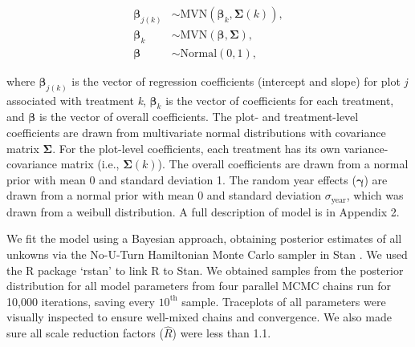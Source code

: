 \documentclass[fleqn,10pt]{wlpeerj} %
\begin{document}
\vspace{-2em}

\begin{align}
\boldsymbol{\beta}_{j(k)} &\sim \text{MVN} \left( \boldsymbol{\beta}_k, \boldsymbol{\Sigma}(k) \right), \\
\boldsymbol{\beta}_{k} &\sim \text{MVN} \left( \boldsymbol{\beta}, \boldsymbol{\Sigma}  \right), \\
\boldsymbol{\beta} &\sim \text{Normal} \left( 0, 1 \right),
\end{align}

\noindent{} where \(\boldsymbol{\beta}_{j(k)}\) is the vector of
regression coefficients (intercept and slope) for plot \emph{j}
associated with treatment \emph{k}, \(\boldsymbol{\beta}_{k}\) is the
vector of coefficients for each treatment, and \(\boldsymbol{\beta}\) is
the vector of overall coefficients. The plot- and treatment-level
coefficients are drawn from multivariate normal distributions with
covariance matrix \(\boldsymbol{\Sigma}\). For the plot-level
coefficients, each treatment has its own variance-covariance matrix
(i.e., \(\boldsymbol{\Sigma}(k)\)). The overall coefficients are drawn
from a normal prior with mean 0 and standard deviation 1. The random
year effects (\(\boldsymbol{\gamma}\)) are drawn from a normal prior
with mean 0 and standard deviation \(\sigma_{\text{year}}\), which was
drawn from a weibull distribution. A full description of model is in
Appendix 2.

We fit the model using a Bayesian approach, obtaining posterior
estimates of all unkowns via the No-U-Turn Hamiltonian Monte Carlo
sampler in Stan \citep{stan2016}. We used the R package `rstan'
\citep{rstan2016} to link R \citep{R2016} to Stan. We obtained samples
from the posterior distribution for all model parameters from four
parallel MCMC chains run for 10,000 iterations, saving every
\(10^{\text{th}}\) sample. Traceplots of all parameters were visually
inspected to ensure well-mixed chains and convergence. We also made sure
all scale reduction factors (\(\hat{R}\)) were less than 1.1.
\end{document}
